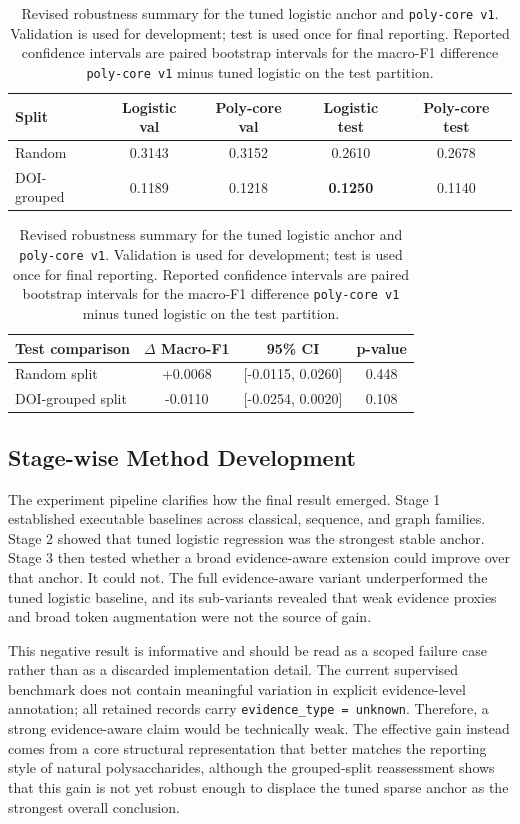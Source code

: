\documentclass{article}
\newcommand{\best}[1]{\textcolor{bestred}{\textbf{#1}}}
\begin{document}
\begin{table}[t]
\centering
\caption{Revised robustness summary for the tuned logistic anchor and \texttt{poly-core v1}. Validation is used for development; test is used once for final reporting. Reported confidence intervals are paired bootstrap intervals for the macro-F1 difference \texttt{poly-core v1} minus tuned logistic on the test partition.}
\label{tab:robustness_results}
\begin{tabular}{lcccc}
\toprule
Split & Logistic val & Poly-core val & Logistic test & Poly-core test \\
\midrule
Random & 0.3143 & 0.3152 & 0.2610 & 0.2678 \\
DOI-grouped & 0.1189 & 0.1218 & \best{0.1250} & 0.1140 \\
\bottomrule
\end{tabular}

\vspace{0.3em}
\begin{tabular}{lccc}
\toprule
Test comparison & $\Delta$ Macro-F1 & 95\% CI & p-value \\
\midrule
Random split & +0.0068 & [-0.0115, 0.0260] & 0.448 \\
DOI-grouped split & -0.0110 & [-0.0254, 0.0020] & 0.108 \\
\bottomrule
\end{tabular}
\end{table}

\subsection{Stage-wise Method Development}

The experiment pipeline clarifies how the final result emerged. Stage 1 established executable baselines across classical, sequence, and graph families. Stage 2 showed that tuned logistic regression was the strongest stable anchor. Stage 3 then tested whether a broad evidence-aware extension could improve over that anchor. It could not. The full evidence-aware variant underperformed the tuned logistic baseline, and its sub-variants revealed that weak evidence proxies and broad token augmentation were not the source of gain.

This negative result is informative and should be read as a scoped failure case rather than as a discarded implementation detail. The current supervised benchmark does not contain meaningful variation in explicit evidence-level annotation; all retained records carry \texttt{evidence\_type = unknown}. Therefore, a strong evidence-aware claim would be technically weak. The effective gain instead comes from a core structural representation that better matches the reporting style of natural polysaccharides, although the grouped-split reassessment shows that this gain is not yet robust enough to displace the tuned sparse anchor as the strongest overall conclusion.
\end{document}
